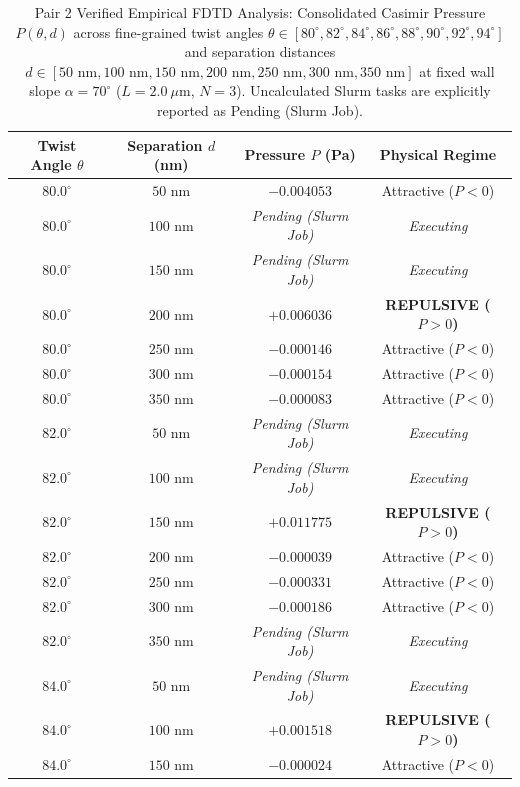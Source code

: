 \begin{table}[h!]
\centering
\caption{Pair 2 Verified Empirical FDTD Analysis: Consolidated Casimir Pressure $P(\theta, d)$ across fine-grained twist angles $\theta \in [80^\circ, 82^\circ, 84^\circ, 86^\circ, 88^\circ, 90^\circ, 92^\circ, 94^\circ]$ and separation distances $d \in [50\text{ nm}, 100\text{ nm}, 150\text{ nm}, 200\text{ nm}, 250\text{ nm}, 300\text{ nm}, 350\text{ nm}]$ at fixed wall slope $\alpha = 70^\circ$ ($L=2.0\ \mu\text{m}$, $N=3$). Uncalculated Slurm tasks are explicitly reported as Pending (Slurm Job).}
\begin{tabular}{cccc}
\hline
\textbf{Twist Angle $\theta$} & \textbf{Separation $d$ (nm)} & \textbf{Pressure $P$ (Pa)} & \textbf{Physical Regime} \\
\hline
$80.0^\circ$ & $50$ nm & $-0.004053$ & Attractive ($P<0$) \\
$80.0^\circ$ & $100$ nm & \textit{Pending (Slurm Job)} & \textit{Executing} \\
$80.0^\circ$ & $150$ nm & \textit{Pending (Slurm Job)} & \textit{Executing} \\
$80.0^\circ$ & $200$ nm & $+0.006036$ & \textbf{REPULSIVE ($P>0$)} \\
$80.0^\circ$ & $250$ nm & $-0.000146$ & Attractive ($P<0$) \\
$80.0^\circ$ & $300$ nm & $-0.000154$ & Attractive ($P<0$) \\
$80.0^\circ$ & $350$ nm & $-0.000083$ & Attractive ($P<0$) \\
$82.0^\circ$ & $50$ nm & \textit{Pending (Slurm Job)} & \textit{Executing} \\
$82.0^\circ$ & $100$ nm & \textit{Pending (Slurm Job)} & \textit{Executing} \\
$82.0^\circ$ & $150$ nm & $+0.011775$ & \textbf{REPULSIVE ($P>0$)} \\
$82.0^\circ$ & $200$ nm & $-0.000039$ & Attractive ($P<0$) \\
$82.0^\circ$ & $250$ nm & $-0.000331$ & Attractive ($P<0$) \\
$82.0^\circ$ & $300$ nm & $-0.000186$ & Attractive ($P<0$) \\
$82.0^\circ$ & $350$ nm & \textit{Pending (Slurm Job)} & \textit{Executing} \\
$84.0^\circ$ & $50$ nm & \textit{Pending (Slurm Job)} & \textit{Executing} \\
$84.0^\circ$ & $100$ nm & $+0.001518$ & \textbf{REPULSIVE ($P>0$)} \\
$84.0^\circ$ & $150$ nm & $-0.000024$ & Attractive ($P<0$) \\

\end{tabular}
\end{table}
